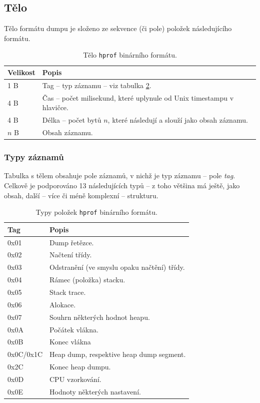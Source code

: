 \subsection{Tělo}
Tělo formátu dumpu je složeno ze sekvence (či pole) položek následujícího formátu.
\begin{table}[ht!]
    \begin{tabularx}{\textwidth}{|l|X|}
        \hline
    \textbf{Velikost} & \textbf{Popis} \\ \hline \hline
    1 B & Tag -- typ záznamu -- viz tabulka \ref{table-hprof-types}. \\
    4 B & Čas -- počet milisekund, které uplynule od Unix timestampu v hlavičce. \\
    4 B & Délka -- počet bytů $n$, které následují a slouží jako obsah záznamu. \\
    $n$ B & Obsah záznamu. \\ \hline                                                                   
    \end{tabularx}
    \caption{Tělo \texttt{hprof} binárního formátu.}
    \label{table-hprof-body}
\end{table}


\subsubsection{Typy záznamů}
Tabulka s tělem obsahuje pole záznamů, v nichž je typ záznamu -- pole \textit{tag}. Celkově je podporováno 13 následujících typů -- z toho většina má ještě, jako obsah, další -- více či méně komplexní -- strukturu.
\begin{table}[ht!]
    \begin{tabularx}{\textwidth}{|l|X|}
        \hline
    \textbf{Tag} & \textbf{Popis} \\ \hline \hline
    0x01 & Dump řetězce. \\
    0x02 & Načtení třídy. \\
    0x03 & Odstranění (ve smyslu opaku načtění) třídy. \\
    0x04 & Rámec (položka) stacku. \\
    0x05 & Stack trace. \\
    0x06 & Alokace. \\
    0x07 & Souhrn některých hodnot heapu. \\
    0x0A & Počátek vlákna. \\
    0x0B & Konec vlákna \\
    0x0C/0x1C & Heap dump, respektive heap dump segment. \\
    0x2C & Konec heap dumpu. \\
    0x0D & CPU vzorkování. \\
    0x0E & Hodnoty některých nastavení. \\ \hline                                                                   
    \end{tabularx}
    \caption{Typy položek \texttt{hprof} binárního formátu.}
    \label{table-hprof-types}
\end{table}

